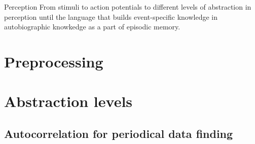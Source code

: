 \begin{frame}{Perception}
    From stimuli to action potentials to different levels of abstraction in perception until the language that builds event-specific knowledge in autobiographic knowkedge as a part of episodic memory.
    
    \section{Preprocessing}
    \section{Abstraction levels}
        
        \subsection{Autocorrelation for periodical data finding}
\end{frame}